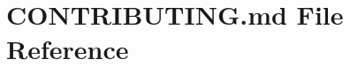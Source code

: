 \hypertarget{_c_o_n_t_r_i_b_u_t_i_n_g_8md}{}\section{C\+O\+N\+T\+R\+I\+B\+U\+T\+I\+N\+G.\+md File Reference}
\label{_c_o_n_t_r_i_b_u_t_i_n_g_8md}
